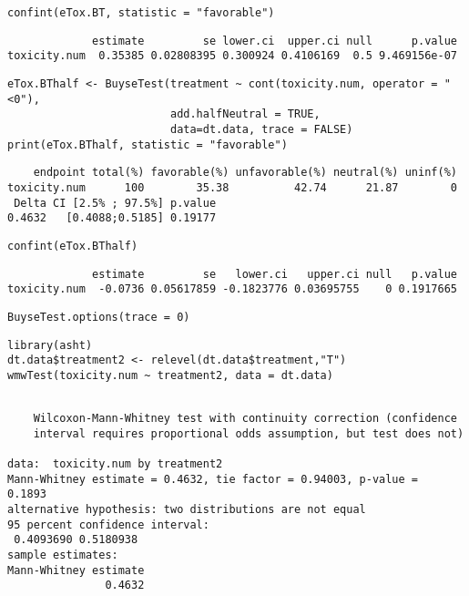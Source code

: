 \documentclass[12pt]{article}
\begin{document}
\lstset{language=r,label= ,caption= ,captionpos=b,numbers=none}
\begin{lstlisting}
confint(eTox.BT, statistic = "favorable")
\end{lstlisting}

\begin{verbatim}
             estimate         se lower.ci  upper.ci null      p.value
toxicity.num  0.35385 0.02808395 0.300924 0.4106169  0.5 9.469156e-07
\end{verbatim}



\lstset{language=r,label= ,caption= ,captionpos=b,numbers=none}
\begin{lstlisting}
eTox.BThalf <- BuyseTest(treatment ~ cont(toxicity.num, operator = "<0"),
                         add.halfNeutral = TRUE,
                         data=dt.data, trace = FALSE)
print(eTox.BThalf, statistic = "favorable")
\end{lstlisting}

\begin{verbatim}
    endpoint total(%) favorable(%) unfavorable(%) neutral(%) uninf(%)
toxicity.num      100        35.38          42.74      21.87        0
 Delta CI [2.5% ; 97.5%] p.value
0.4632   [0.4088;0.5185] 0.19177
\end{verbatim}


\lstset{language=r,label= ,caption= ,captionpos=b,numbers=none}
\begin{lstlisting}
confint(eTox.BThalf)
\end{lstlisting}

\begin{verbatim}
             estimate         se   lower.ci   upper.ci null   p.value
toxicity.num  -0.0736 0.05617859 -0.1823776 0.03695755    0 0.1917665
\end{verbatim}



\lstset{language=r,label= ,caption= ,captionpos=b,numbers=none}
\begin{lstlisting}
BuyseTest.options(trace = 0)
\end{lstlisting}

\lstset{language=r,label= ,caption= ,captionpos=b,numbers=none}
\begin{lstlisting}
library(asht)
dt.data$treatment2 <- relevel(dt.data$treatment,"T")
wmwTest(toxicity.num ~ treatment2, data = dt.data)
\end{lstlisting}

\begin{verbatim}

	Wilcoxon-Mann-Whitney test with continuity correction (confidence
	interval requires proportional odds assumption, but test does not)

data:  toxicity.num by treatment2
Mann-Whitney estimate = 0.4632, tie factor = 0.94003, p-value =
0.1893
alternative hypothesis: two distributions are not equal
95 percent confidence interval:
 0.4093690 0.5180938
sample estimates:
Mann-Whitney estimate 
               0.4632
\end{verbatim}
\end{document}
